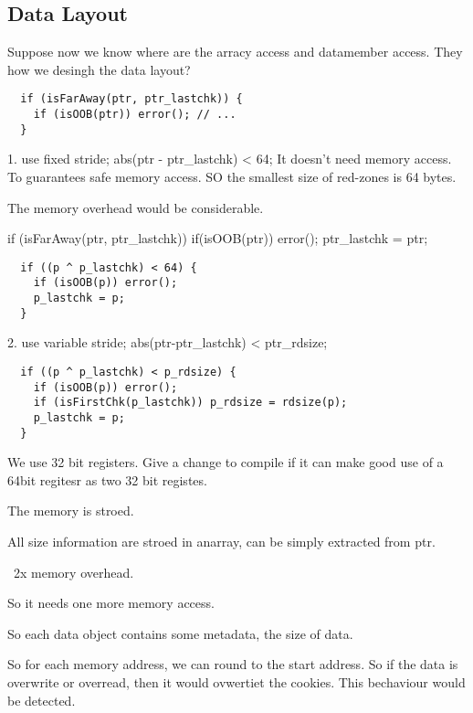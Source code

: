 \subsection{Data Layout}



Suppose now we know where are the arracy access and datamember access.
They how we desingh the data layout?


\begin{verbatim}
  if (isFarAway(ptr, ptr_lastchk)) {
    if (isOOB(ptr)) error(); // ...
  }
\end{verbatim}

1. use fixed stride;
abs(ptr - ptr_lastchk) < 64;
It doesn't need memory access.
To guarantees safe memory access. SO the smallest size of red-zones is 64 bytes.

The memory overhead would be considerable.


if (isFarAway(ptr, ptr_lastchk)) {
    if(isOOB(ptr)) error();
    ptr_lastchk = ptr;
  }

\begin{verbatim}
  if ((p ^ p_lastchk) < 64) {
    if (isOOB(p)) error();
    p_lastchk = p;
  }
\end{verbatim}


2. use variable stride;
abs(ptr-ptr_lastchk) < ptr_rdsize;



\begin{verbatim}
  if ((p ^ p_lastchk) < p_rdsize) {
    if (isOOB(p)) error();
    if (isFirstChk(p_lastchk)) p_rdsize = rdsize(p);
    p_lastchk = p;
  }
\end{verbatim}


We use 32 bit registers. Give a change to compile if it can make good use of a 64bit regitesr as two 32 bit registes.

The memory is stroed.


All size information are stroed in anarray, can be simply extracted from ptr.

~2x memory overhead.

So it needs one more memory access.


So each data object contains some metadata, the size of data.

So for each memory address, we can round to the start address.
So if the data is overwrite or overread, then it would ovwertiet the cookies.
This bechaviour would be detected.

